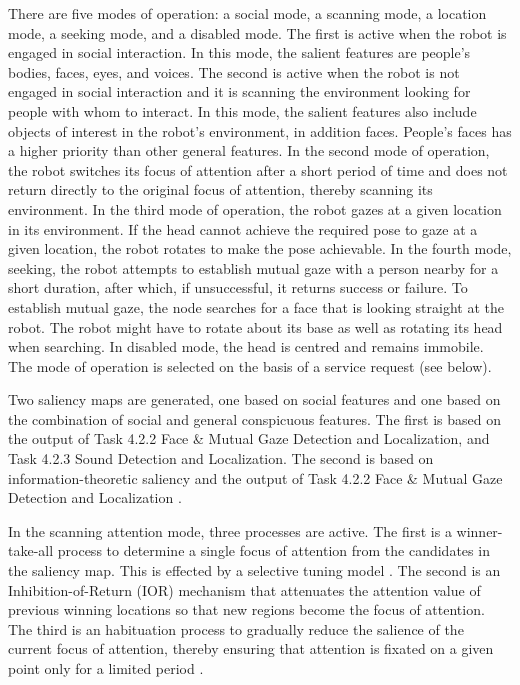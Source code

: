 \documentclass{CSSRforAfrica}
\begin{document}
{{There are five modes of operation: a social mode, a scanning mode, a location mode, a seeking mode, and a disabled mode. The first is active when the robot is engaged in social interaction.  In this mode, the salient features are people's bodies, faces, eyes, and voices.  The second is active when the robot is not engaged in social interaction and it  is scanning the environment looking for people with whom to interact.  In this mode, the salient features also include objects of interest in the robot's environment, in addition faces. People's faces has a higher priority than other general features.  In the second mode of operation, the robot  switches its focus of attention after a short period of time and  does not return directly to the original focus of attention, thereby scanning its environment. In the third mode of operation, the robot gazes at a given location in its environment. If the head cannot achieve the required pose to gaze at a given location, the robot  rotates to make the pose achievable. In the fourth mode, seeking, the robot attempts to establish mutual gaze with a person nearby for a short duration, after which, if unsuccessful, it returns success or failure. To establish mutual gaze, the node searches for a face that is looking straight at the robot.  The robot might have to rotate about its base as well as rotating its head when searching. In disabled mode, the head is centred and remains immobile. The mode of operation is selected on the basis of a service request (see below).

Two saliency maps are  generated, one based on social features and one based on the combination of social and general conspicuous features. The first is based on  the output of  Task 4.2.2 Face \& Mutual Gaze Detection and Localization, and Task 4.2.3 Sound Detection and Localization. The second  is based on   information-theoretic saliency  and the output of Task 4.2.2 Face \& Mutual Gaze Detection and Localization \cite{BruceTsotsos09}. 

In the  scanning attention mode, three processes are active.
The first is a winner-take-all process to determine a single focus of attention from the candidates in the saliency map. This is effected by a selective tuning model \cite{Tsotsosetal95,Tsotsos06,Tsotsos11}.
The second is an Inhibition-of-Return (IOR) mechanism that attenuates the attention value of previous winning locations so that new regions become the focus of attention.
The third is an habituation process to gradually reduce the salience of the current focus of attention, thereby ensuring that attention is fixated on a given point only for a limited period \cite{ZaharescuRothensteinTsotsos05}. 

}}
\end{document}

